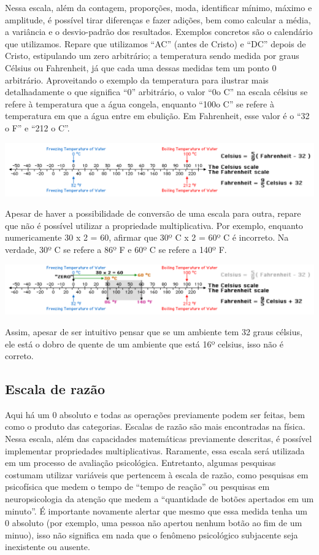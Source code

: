\documentclass[
]{book}
\begin{document}
Nessa escala, além da contagem, proporções, moda, identificar mínimo, máximo e amplitude, é possível tirar diferenças e fazer adições, bem como calcular a média, a variância e o desvio-padrão dos resultados.
Exemplos concretos são o calendário que utilizamos. Repare que utilizamos ``AC'' (antes de Cristo) e ``DC'' depois de Cristo, estipulando um zero arbitrário; a temperatura sendo medida por graus Célsius ou Fahrenheit, já que cada uma dessas medidas tem um ponto 0 arbitrário. Aproveitando o exemplo da temperatura para ilustrar mais detalhadamente o que significa ``0'' arbitrário, o valor ``0o C'' na escala célsius se refere à temperatura que a água congela, enquanto ``100o C'' se refere à temperatura em que a água entre em ebulição. Em Fahrenheit, esse valor é o ``32 o F'' e ``212 o C''.

\includegraphics{./img/cap_escala_medida_farenheit1.png}

Apesar de haver a possibilidade de conversão de uma escala para outra, repare que não é possível utilizar a propriedade multiplicativa. Por exemplo, enquanto numericamente 30 x 2 = 60, afirmar que 30º C x 2 = 60º C é incorreto. Na verdade, 30º C se refere a 86º F e 60º C se refere a 140º F.

\includegraphics{./img/cap_escala_medida_farenheit2.png}

Assim, apesar de ser intuitivo pensar que se um ambiente tem 32 graus célsius, ele está o dobro de quente de um ambiente que está 16º celsius, isso não é correto.

\hypertarget{escala-de-razuxe3o}{%
\subsection{Escala de razão}\label{escala-de-razuxe3o}}

Aqui há um 0 absoluto e todas as operações previamente podem ser feitas, bem como o produto das categorias. Escalas de razão são mais encontradas na física. Nessa escala, além das capacidades matemáticas previamente descritas, é possível implementar propriedades multiplicativas. Raramente, essa escala será utilizada em um processo de avaliação psicológica. Entretanto, algumas pesquisas costumam utilizar variáveis que pertencem à escala de razão, como pesquisas em psicofísica que medem o tempo de ``tempo de reação'' ou pesquisas em neuropsicologia da atenção que medem a ``quantidade de botões apertados em um minuto''. É importante novamente alertar que mesmo que essa medida tenha um 0 absoluto (por exemplo, uma pessoa não apertou nenhum botão ao fim de um minuo), isso não significa em nada que o fenômeno psicológico subjacente seja inexistente ou ausente.
\end{document}
